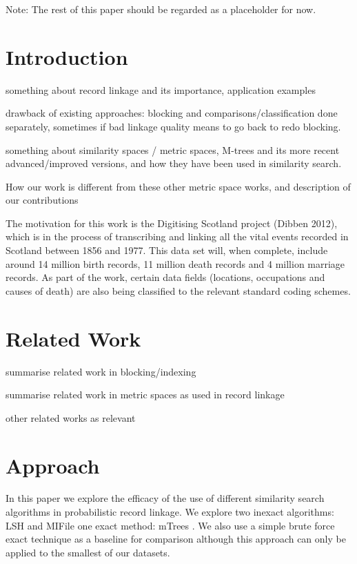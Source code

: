 \documentclass{llncs}
\begin{document}
Note: The rest of this paper should be regarded as a placeholder for now.

\section{Introduction}
\label{sec-intro}

something about record linkage and its importance, application examples

drawback of existing approaches: blocking and comparisons/classification
done separately, sometimes if bad linkage quality means to go back to redo
blocking.

something about similarity spaces / metric spaces, M-trees and its
more recent advanced/improved versions, and how they have been used in
similarity search.

How our work is different from these other metric space works, and
description of our contributions

The motivation for this work is the Digitising Scotland project (Dibben 2012), which is in the process of transcribing and linking all the vital events recorded in Scotland between 1856 and 1977. This data set will, when complete, include around 14 million birth records, 11 million death records and 4 million marriage records. As part of the work, certain data fields (locations, occupations and causes of death) are also being classified to the relevant standard coding schemes.



\section{Related Work}
\label{sec-related}

summarise related work in blocking/indexing

summarise related work in metric spaces as used in record linkage

other related works as relevant


\section{Approach}
\label{sec-approach}

In this paper we explore the efficacy of the use of different similarity search algorithms in probabilistic record linkage. We explore two inexact algorithms: LSH and MIFile \cite{amato2014mi} one exact method: mTrees \cite{paolociaccia2m}. We also use a simple brute force exact technique as a baseline for comparison although this approach can only be applied to the smallest of our datasets.
\end{document}
